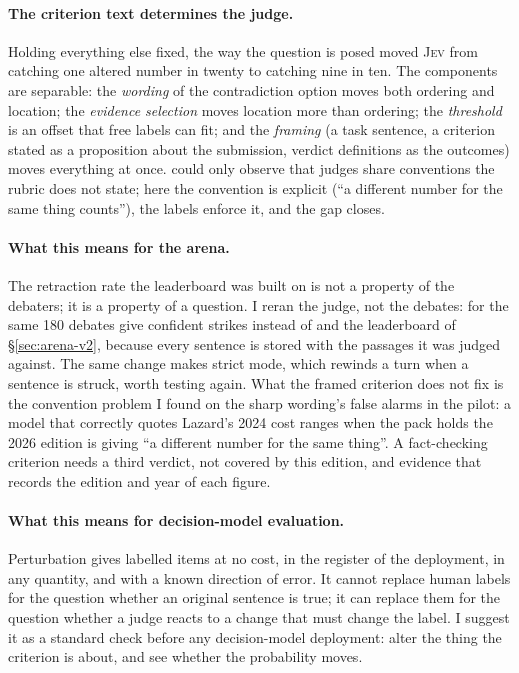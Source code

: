 \documentclass[11pt,a4paper]{article}
\newcommand{\jev}{\textsc{Jev}}
\begin{document}
\paragraph{The criterion text determines the judge.} Holding everything else fixed, the way the question is posed moved \jev{} from catching one altered number in twenty to catching nine in ten. The components are separable: the \emph{wording} of the contradiction option moves both ordering and location; the \emph{evidence selection} moves location more than ordering; the \emph{threshold} is an offset that free labels can fit; and the \emph{framing} (a task sentence, a criterion stated as a proposition about the submission, verdict definitions as the outcomes) moves everything at once. \citet{rao2026jev} could only observe that judges share conventions the rubric does not state; here the convention is explicit (``a different number for the same thing counts''), the labels enforce it, and the gap closes.

\paragraph{What this means for the arena.} The retraction rate the leaderboard was built on is not a property of the debaters; it is a property of a question. I reran the judge, not the debates: for \studyLbCost{} the same 180 debates give \studyLbContradictedConfident{} confident strikes instead of \studyLbPilotStruck{} and the leaderboard of \S\ref{sec:arena-v2}, because every sentence is stored with the passages it was judged against. The same change makes strict mode, which rewinds a turn when a sentence is struck, worth testing again. What the framed criterion does not fix is the convention problem I found on the sharp wording's false alarms in the pilot: a model that correctly quotes Lazard's 2024 cost ranges when the pack holds the 2026 edition is giving ``a different number for the same thing''. A fact-checking criterion needs a third verdict, not covered by this edition, and evidence that records the edition and year of each figure.

\paragraph{What this means for decision-model evaluation.} Perturbation gives labelled items at no cost, in the register of the deployment, in any quantity, and with a known direction of error. It cannot replace human labels for the question whether an original sentence is true; it can replace them for the question whether a judge reacts to a change that must change the label. I suggest it as a standard check before any decision-model deployment: alter the thing the criterion is about, and see whether the probability moves.
\end{document}
